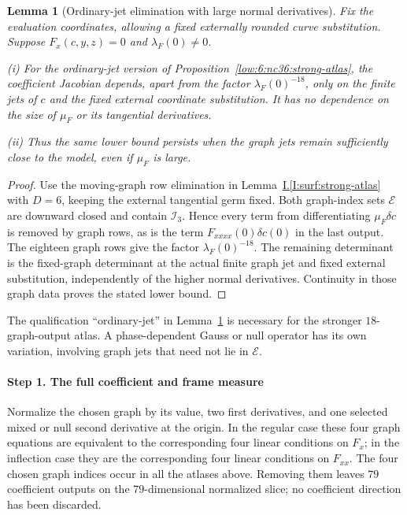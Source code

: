 \documentclass[11pt]{amsart}
\newtheorem{lemma}[theorem]{Lemma}
\theoremstyle{definition}
\theoremstyle{remark}
\numberwithin{equation}{section}
\newcommand{\partIref}[1]{\hyperref[I:#1]{I.\ref*{I:#1}}}
\begin{document}
\begin{lemma}[Ordinary-jet elimination with large normal derivatives]\label{low:6:nc36:large-normal-ordinary}
Fix the evaluation coordinates, allowing a fixed externally rounded curve substitution. Suppose $F_x(c,y,z)=0$ and $\lambda_F(0)\ne0$.

\noindent\textup{(i)} For the ordinary-jet version of Proposition~\ref{low:6:nc36:strong-atlas}, the coefficient Jacobian depends, apart from the factor $\lambda_F(0)^{-18}$, only on the finite jets of $c$ and the fixed external coordinate substitution. It has no dependence on the size of $\mu_F$ or its tangential derivatives.

\noindent\textup{(ii)} Thus the same lower bound persists when the graph jets remain sufficiently close to the model, even if $\mu_F$ is large.
\end{lemma}
\begin{proof}
Use the moving-graph row elimination in Lemma~\partIref{surf:strong-atlas} with $D=6$, keeping the external tangential germ fixed. Both graph-index sets $\mathcal E$ are downward closed and contain $\mathcal I_3$. Hence every term from differentiating $\mu_F\delta c$ is removed by graph rows, as is the term $F_{xxxx}(0)\delta c(0)$ in the last output. The eighteen graph rows give the factor $\lambda_F(0)^{-18}$. The remaining determinant is the fixed-graph determinant at the actual finite graph jet and fixed external substitution, independently of the higher normal derivatives. Continuity in those graph data proves the stated lower bound.
\end{proof}

The qualification ``ordinary-jet'' in Lemma~\ref{low:6:nc36:large-normal-ordinary} is necessary for the stronger $18$-graph-output atlas. A phase-dependent Gauss or null operator has its own variation, involving graph jets that need not lie in $\mathcal E$.


\paragraph{Step 1. The full coefficient and frame measure}
Normalize the chosen graph by its value, two first derivatives, and one selected mixed or null second derivative at the origin. In the regular case these four graph equations are equivalent to the corresponding four linear conditions on $F_x$; in the inflection case they are the corresponding four linear conditions on $F_{xx}$. The four chosen graph indices occur in all the atlases above. Removing them leaves $79$ coefficient outputs on the $79$-dimensional normalized slice; no coefficient direction has been discarded.
\end{document}
